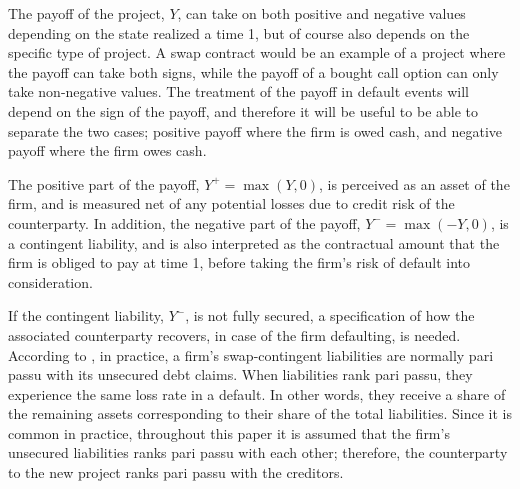 \documentclass[../main.tex]{subfiles}
\begin{document}
        The payoff of the project, $Y$, can take on both positive and negative values
        depending on the state realized a time 1, 
        but of course also depends on the specific type of project. 
        A swap contract would be an example of a project where the payoff can take both signs,
        while the payoff of a bought call option can only take non-negative values.
        The treatment of the payoff in default events will depend on the sign of the payoff,
        and therefore it will be useful to be able to separate the two cases;
        positive payoff where the firm is owed cash,
        and negative payoff where the firm owes cash.

        The positive part of the payoff, $Y^{+}=\max\left(Y,0\right)$, is perceived as an asset of the firm, and is measured net of any potential losses due to credit risk of the counterparty.
        In addition, the negative part of the payoff, $Y^{-} = \max \left(-Y,0\right)$, is a contingent liability, and is also interpreted as the contractual amount that the firm is obliged to pay at time 1, before taking the firm's risk of default into consideration.

        If the contingent liability, $Y^{-}$, is not fully secured, a specification of how the associated counterparty recovers, in case of the firm defaulting, is needed.
        According to \textcite{ADS2019}, in practice, a firm's swap-contingent liabilities 
        are normally pari passu with its unsecured debt claims.
        When liabilities rank pari passu, they experience the same loss rate in a default.
        In other words, they receive a share of the remaining assets 
        corresponding to their share of the total liabilities.
        Since it is common in practice, throughout this paper it is assumed that the firm's 
        unsecured liabilities ranks pari passu with each other;
        therefore, the counterparty to the new project ranks pari passu with the creditors.
\end{document}
